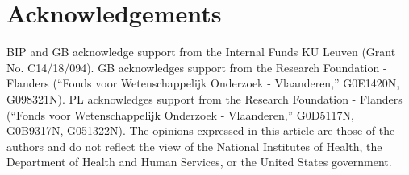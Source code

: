 \section{Acknowledgements}
BIP and GB acknowledge support from the Internal Funds KU Leuven (Grant No. C14/18/094). GB acknowledges support from the Research Foundation - Flanders (“Fonds voor Wetenschappelijk Onderzoek - Vlaanderen,” G0E1420N, G098321N). PL acknowledges support from the Research Foundation - Flanders (“Fonds voor Wetenschappelijk Onderzoek - Vlaanderen,” G0D5117N, G0B9317N, G051322N). The opinions expressed in this article are those of the authors and do not reflect the view of the National Institutes of Health, the Department of Health and Human Services, or the United States government. 





\cleardoublepage

